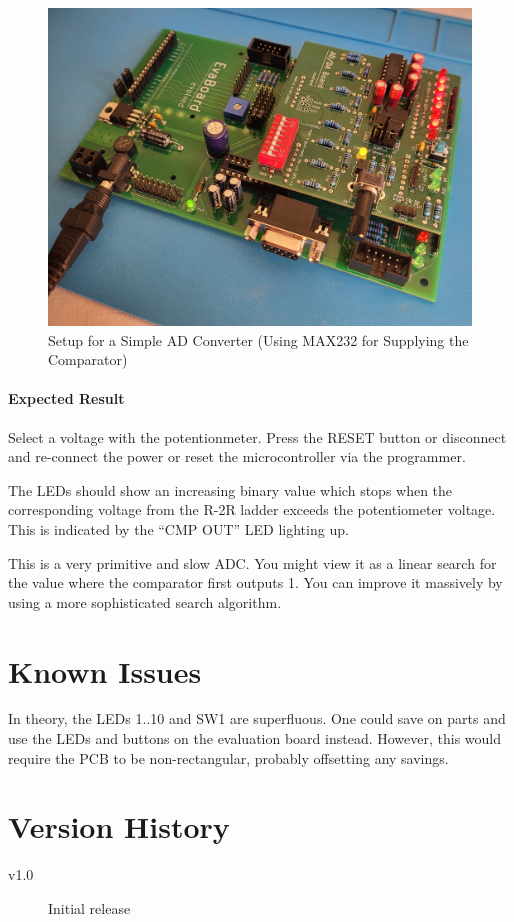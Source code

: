 \documentclass{article}
\newenvironment{note}{\begin{tcolorbox}[colback=blue!5!white,colframe=blue!75!black,title=\textbf{Note}]}{\end{tcolorbox}}
\begin{document}
\begin{figure}[htb]
\centering
\includegraphics[width=.85\textwidth]{Pictures/ADC.jpg}
\caption{Setup for a Simple AD Converter (Using MAX232 for Supplying the Comparator)}
\label{fig:adc}
\end{figure}

\paragraph{Expected Result}
Select a voltage with the potentionmeter. Press the RESET button or disconnect and re-connect the power or reset the microcontroller via the programmer. 

The LEDs should show an increasing binary value which stops when the corresponding voltage from the R-2R ladder exceeds the potentiometer voltage. This is indicated by the ``CMP OUT'' LED lighting up. 

\begin{note}
This is a very primitive and slow ADC. You might view it as a linear search for the value where the comparator first outputs 1. You can improve it massively by using a more sophisticated search algorithm. 
\end{note}

\section{Known Issues}
In theory, the LEDs 1..10 and SW1 are superfluous. One could save on parts and use the LEDs and buttons on the evaluation board instead. However, this would require the PCB to be non-rectangular, probably offsetting any savings. 

\section{Version History}
\begin{description}
\item[v1.0] Initial release
\end{description}
\end{document}
